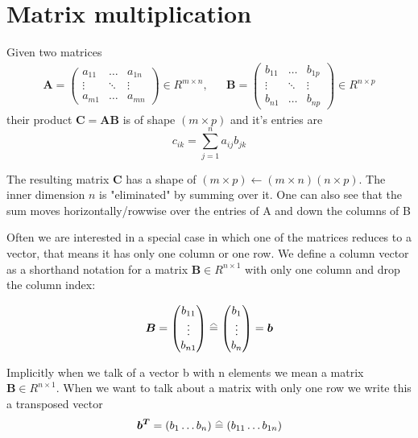 \section{Matrix multiplication}
Given two matrices 
\begin{align}
    \bm{A} = 
    \begin{pmatrix}
        a_{11} & \hdots & a_{1n} \\ 
        \vdots & \ddots & \vdots \\
        a_{m1} & \hdots & a_{mn}
    \end{pmatrix} \in R^{m \times n}, &&
    \bm{B} = 
    \begin{pmatrix}
        b_{11} & \hdots & b_{1p} \\ 
        \vdots & \ddots & \vdots \\
        b_{n1} & \hdots & b_{np}
    \end{pmatrix} \in R^{n \times p}
\end{align}
their product $\bm{C} = \bm{A}\bm{B}$ is of shape $(m \times p)$ and it's entries are
\begin{equation}
    c_{ik} = \sum_{j=1}^n a_{ij} b_{jk}
\end{equation}

\newcommand{\x}{\times}
The resulting matrix $\bm{C}$ has a shape of $(m \x p) \leftarrow (m \x n)(n \x p)$. The inner dimension $n$ is "eliminated" by summing over it. One can also see that the sum moves horizontally/rowwise over the entries of A and down the
columns of B

Often we are interested in a special case in which one of the matrices reduces to a vector, that means it has only
one column or one row. We define a column vector as a shorthand notation for a matrix $\bm{B} \in R^{n \x 1}$ with only one column and drop the column index:

\begin{equation}
    \bm{B} =
    \begin{pmatrix}
    b_{11} \\
    \vdots \\
    b_{n1}
    \end{pmatrix}     \equalhat
    \begin{pmatrix}
        b_{1} \\
        \vdots \\
        b_{n}
    \end{pmatrix} = \bm{b}
\end{equation}

Implicitly when we talk of a vector b with n elements we mean a matrix $\bm{B} \in R^{n\x 1}$. When we want to talk
about a matrix with only one row we write this a transposed vector
\begin{equation}
    \bm{b^T} = (b_1 \hdots b_n) \equalhat (b_{11} \hdots b_{1n})
\end{equation}

